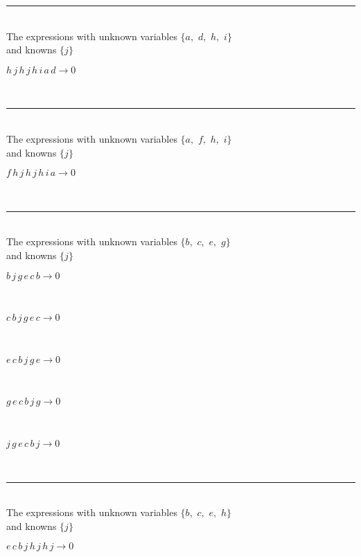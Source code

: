 \rule[3pt]{6in}{.7pt}\\
The expressions with unknown variables $\{a,
$ $
d,
$ $
h,
$ $
i\}$\\
and knowns $\{j\}$\smallskip\\
\begin{minipage}{6in}
$
h\,
 j\,
 h\,
 j\,
 h\,
 i\,
 a\,
 d\rightarrow 0
$
\end{minipage}\\
\rule[3pt]{6in}{.7pt}\\
The expressions with unknown variables $\{a,
$ $
f,
$ $
h,
$ $
i\}$\\
and knowns $\{j\}$\smallskip\\
\begin{minipage}{6in}
$
f\,
 h\,
 j\,
 h\,
 j\,
 h\,
 i\,
 a\rightarrow 0
$
\end{minipage}\\
\rule[3pt]{6in}{.7pt}\\
The expressions with unknown variables $\{b,
$ $
c,
$ $
e,
$ $
g\}$\\
and knowns $\{j\}$\smallskip\\
\begin{minipage}{6in}
$
b\,
 j\,
 g\,
 e\,
 c\,
 b\rightarrow 0
$
\end{minipage}\medskip \\
\begin{minipage}{6in}
$
c\,
 b\,
 j\,
 g\,
 e\,
 c\rightarrow 0
$
\end{minipage}\medskip \\
\begin{minipage}{6in}
$
e\,
 c\,
 b\,
 j\,
 g\,
 e\rightarrow 0
$
\end{minipage}\medskip \\
\begin{minipage}{6in}
$
g\,
 e\,
 c\,
 b\,
 j\,
 g\rightarrow 0
$
\end{minipage}\medskip \\
\begin{minipage}{6in}
$
j\,
 g\,
 e\,
 c\,
 b\,
 j\rightarrow 0
$
\end{minipage}\\
\rule[3pt]{6in}{.7pt}\\
The expressions with unknown variables $\{b,
$ $
c,
$ $
e,
$ $
h\}$\\
and knowns $\{j\}$\smallskip\\
\begin{minipage}{6in}
$
e\,
 c\,
 b\,
 j\,
 h\,
 j\,
 h\,
 j\rightarrow 0
$
\end{minipage}\\
